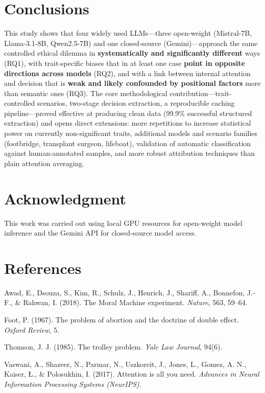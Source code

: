 \documentclass[a4paper, 10pt, twocolumn]{article}
\begin{document}
\section{Conclusions}
This study shows that four widely used LLMs---three open-weight (Mistral-7B, Llama-3.1-8B, Qwen2.5-7B) and one closed-source (Gemini)---approach the same controlled ethical dilemma in \textbf{systematically and significantly different} ways (RQ1), with trait-specific biases that in at least one case \textbf{point in opposite directions across models} (RQ2), and with a link between internal attention and decision that is \textbf{weak and likely confounded by positional factors} more than semantic ones (RQ3). The core methodological contribution---trait-controlled scenarios, two-stage decision extraction, a reproducible caching pipeline---proved effective at producing clean data (99.9\% successful structured extraction) and opens direct extensions: more repetitions to increase statistical power on currently non-significant traits, additional models and scenario families (footbridge, transplant surgeon, lifeboat), validation of automatic classification against human-annotated samples, and more robust attribution techniques than plain attention averaging.

\section*{Acknowledgment}
This work was carried out using local GPU resources for open-weight model inference and the Gemini API for closed-source model access.

\section*{References}
{\small
\noindent Awad, E., Dsouza, S., Kim, R., Schulz, J., Henrich, J., Shariff, A., Bonnefon, J.-F., \& Rahwan, I. (2018). The Moral Machine experiment. \emph{Nature}, 563, 59--64.

\vspace{4pt}\noindent Foot, P. (1967). The problem of abortion and the doctrine of double effect. \emph{Oxford Review}, 5.

\vspace{4pt}\noindent Thomson, J. J. (1985). The trolley problem. \emph{Yale Law Journal}, 94(6).

\vspace{4pt}\noindent Vaswani, A., Shazeer, N., Parmar, N., Uszkoreit, J., Jones, L., Gomez, A. N., Kaiser, Ł., \& Polosukhin, I. (2017). Attention is all you need. \emph{Advances in Neural Information Processing Systems (NeurIPS)}.
}
\end{document}
